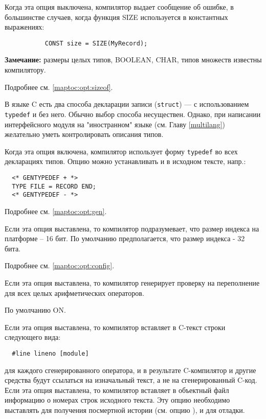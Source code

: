 \begin{description}
Когда эта опция выключена, компилятор выдает сообщение об ошибке,
в большинстве случаев, когда функция SIZE используется в константных 
выражениях:
        \begin{verbatim}
           CONST size = SIZE(MyRecord);
        \end{verbatim}
        
{\bf Замечание:} 
размеры целых типов, BOOLEAN, CHAR, типов множеств
известны компилятору.

Подробнее см. \ref{maptoc:opt:sizeof}.
\fi

\ifgenc
{}
        \MLBegin{}\ModeC{}\MLEnd{} \inline

В языке C есть два способа декларации записи
({\tt struct}) --- с использованием {\tt typedef} и без него.
Обычно выбор способа несуществен. Однако, при написании 
интерфейсного модуля на "иностранном" языке
(см. Главу \ref{multilang}) желательно уметь контролировать
описания типов.

Когда эта опция включена, компилятор использует форму
{\tt typedef} во всех декларациях типов. Опцию можно устанавливать 
и в исходном тексте, напр.:
\begin{verbatim}
  <* GENTYPEDEF + *>
  TYPE FILE = RECORD END;
  <* GENTYPEDEF - *>
\end{verbatim}

Подробнее см. \ref{maptoc:opt:gen}.
\fi

\ifgenc
{}
        \MLBegin{}\ModeC{}\MLEnd{}

Если эта опция выставлена, то компилятор подразумевает, что размер
индекса на платформе -- 16 бит. По умолчанию предполагается, что
размер индекса - 32 бита.

Подробнее см. \ref{maptoc:opt:config}.
\fi

\ifgenc\else
{}
        \MLBegin{}\ModeC{}\MLEnd{} \inline

Если эта опция выставлена, то компилятор генерирует проверку на переполнение 
для всех целых арифметических операторов.

По умолчанию ON.
\fi

        \MLBegin{}\ModeC{}\MLEnd{} \header

\ifgenc
Если эта опция выставлена, то компилятор вставляет в C-текст
строки следующего вида:
\begin{verbatim}
  #line lineno [module]
\end{verbatim}
для каждого сгенерированного оператора, 
и в результате C-компилятор и другие средства будут ссылаться
на изначальный текст, а не на сгенерированный C-код.
\fi
\ifgencode
Если эта опция выставлена, то компилятор вставляет в объектный файл
информацию о номерах строк исходного текста. Эту опцию необходимо
выставлять для получения посмертной истории (см. опцию ), 
и для отладки.
\fi



\end{description}
